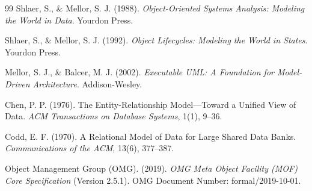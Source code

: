 \documentclass[11pt,a4paper]{article}
\theoremstyle{definition}
\theoremstyle{plain}
\theoremstyle{remark}
\begin{document}
\begin{thebibliography}{99}
Shlaer, S., \& Mellor, S. J. (1988).
\emph{Object-Oriented Systems Analysis: Modeling the World in Data}.
Yourdon Press.

Shlaer, S., \& Mellor, S. J. (1992).
\emph{Object Lifecycles: Modeling the World in States}.
Yourdon Press.

Mellor, S. J., \& Balcer, M. J. (2002).
\emph{Executable UML: A Foundation for Model-Driven Architecture}.
Addison-Wesley.

Chen, P. P. (1976).
The Entity-Relationship Model---Toward a Unified View of Data.
\emph{ACM Transactions on Database Systems}, 1(1), 9--36.

Codd, E. F. (1970).
A Relational Model of Data for Large Shared Data Banks.
\emph{Communications of the ACM}, 13(6), 377--387.

Object Management Group (OMG). (2019).
\emph{OMG Meta Object Facility (MOF) Core Specification} (Version 2.5.1).
OMG Document Number: formal/2019-10-01.

\end{thebibliography}
\end{document}
